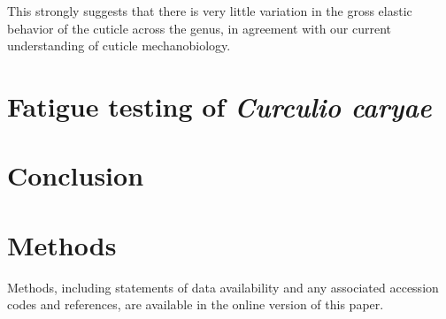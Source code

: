 \documentclass[twocolumn, linenumbers, superscriptaddress]{revtex4-1}
\begin{document}
			This strongly suggests that there is very little variation in the gross elastic behavior of the cuticle across the genus, in agreement with our current understanding of cuticle mechanobiology. 
		
	\section{Fatigue testing of \textit{Curculio caryae}} %

	\section{Conclusion} %

	\section{Methods}
		Methods, including statements of data availability and any associated accession codes and references, are available in the online version of this paper.
	
\end{document}

